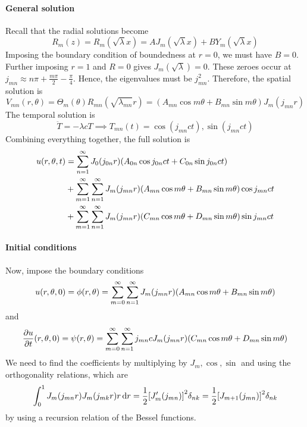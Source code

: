 \documentclass[a4paper]{article}
\begin{document}
\paragraph{General solution}
Recall that the radial solutions become
\[
	R_m(z) = R_m(\sqrt{\lambda} x) = A J_m(\sqrt{\lambda} x) + B Y_m(\sqrt{\lambda} x)
\]
Imposing the boundary condition of boundedness at \( r = 0 \), we must have \( B = 0 \).
Further imposing \( r = 1 \) and \( R = 0 \) gives \( J_m(\sqrt{\lambda}) = 0 \).
These zeroes occur at \( j_{mn} \approx n \pi + \frac{m \pi}{2} - \frac{\pi}{4} \).
Hence, the eigenvalues must be \( j^2_{mn} \).
Therefore, the spatial solution is
\[
	V_{mn}(r, \theta) = \Theta_m(\theta) R_{mn}(\sqrt{\lambda_{mn}} r) = (A_{mn} \cos m \theta + B_{mn} \sin m \theta) J_m (j_{mn} r)
\]
The temporal solution is
\[
	\ddot T = -\lambda c T \implies T_{mn}(t) = \cos(j_{mn} ct), \sin(j_{mn} ct)
\]
Combining everything together, the full solution is
\begin{align*}
	u(r,\theta,t) & = \sum_{n=1}^\infty J_0(j_{0n} r) \qty( A_{0n}\cos j_{0n}ct + C_{0n}\sin j_{0n}ct )                                    \\
	              & + \sum_{m=1}^\infty \sum_{n=1}^\infty J_m (j_{mn}r) \qty( A_{mn} \cos m \theta + B_{mn} \sin m\theta ) \cos j_{mn} ct \\
	              & + \sum_{m=1}^\infty \sum_{n=1}^\infty J_m (j_{mn}r) \qty( C_{mn} \cos m \theta + D_{mn} \sin m\theta ) \sin j_{mn} ct
\end{align*}

\paragraph{Initial conditions} 
Now, impose the boundary conditions
\[
	u(r,\theta,0) = \phi(r,\theta) = \sum_{m=0}^\infty \sum_{n=1}^\infty J_m (j_{mn}r) \qty( A_{mn} \cos m \theta + B_{mn} \sin m\theta )
\]
and
\[
	\pdv{u}{t}\qty(r,\theta,0) = \psi(r,\theta) = \sum_{m=0}^\infty \sum_{n=1}^\infty j_{mn} c J_m (j_{mn}r) \qty( C_{mn} \cos m \theta + D_{mn} \sin m\theta )
\]
We need to find the coefficients by multiplying by \( J_m, \cos, \sin \) and using the orthogonality relations, which are
\[
	\int_0^1 J_m(j_{mn} r) J_m(j_{mk} r) r \,\mathrm{d}{r} = \frac{1}{2}\qty[J_m'(j_{mn})]^2 \delta_{nk} = \frac{1}{2}\qty[J_{m+1}(j_{mn})]^2 \delta_{nk}
\]
by using a recursion relation of the Bessel functions.
\end{document}
